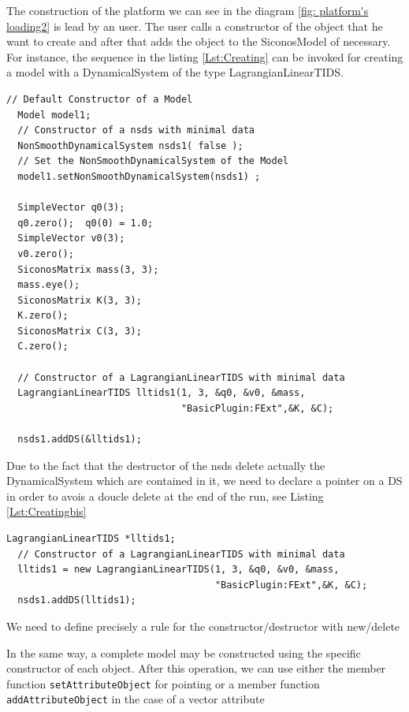 The construction of the platform we can see in the diagram \ref{fig: platform's loading2} is lead by an user. The user calls a constructor of the object that he want to create and after that adds the object to the SiconosModel of necessary. For instance, the sequence in the listing \ref{Lst:Creating} can be invoked for creating a model with a DynamicalSystem of the type LagrangianLinearTIDS.

\begin{lstlisting}[frame=single, caption={Creating a model through the API C++,label={Lst:Creating}}]
  // Default Constructor of a Model
  Model model1; 
  // Constructor of a nsds with minimal data 
  NonSmoothDynamicalSystem nsds1( false );
  // Set the NonSmoothDynamicalSystem of the Model
  model1.setNonSmoothDynamicalSystem(nsds1) ;
        
  SimpleVector q0(3);
  q0.zero();  q0(0) = 1.0;                
  SimpleVector v0(3);
  v0.zero();             
  SiconosMatrix mass(3, 3);
  mass.eye();
  SiconosMatrix K(3, 3);
  K.zero();                
  SiconosMatrix C(3, 3);
  C.zero();

  // Constructor of a LagrangianLinearTIDS with minimal data 
  LagrangianLinearTIDS lltids1(1, 3, &q0, &v0, &mass,
                               "BasicPlugin:FExt",&K, &C);

  nsds1.addDS(&lltids1);

\end{lstlisting}





 Due to the fact that the destructor of the nsds delete actually the DynamicalSystem which are contained in it, we need to declare a pointer on a DS in  order to avois a doucle delete at the end of the run, see Listing \ref{Lst:Creatingbis}

\begin{lstlisting}[frame=single, caption={Creating a model through the API C++, bis},label={Lst:Creatingbis}]
  LagrangianLinearTIDS *lltids1;
  // Constructor of a LagrangianLinearTIDS with minimal data 
  lltids1 = new LagrangianLinearTIDS(1, 3, &q0, &v0, &mass,
                                     "BasicPlugin:FExt",&K, &C);
  nsds1.addDS(lltids1);
\end{lstlisting}
\begin{ndr}
We need to define precisely a rule for the constructor/destructor with new/delete
\end{ndr}
In the same way,  a complete model may be constructed using the specific constructor of each object. After this operation, we can use either the member function \texttt{setAttributeObject} for pointing or  a member function  \texttt{addAttributeObject} in the case of a vector attribute

